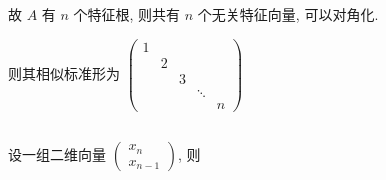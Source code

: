 		 故 \( A \) 有 \( n \) 个特征根, 则共有 \( n \) 个无关特征向量, 可以对角化.

		 则其相似标准形为 \( \begin{pmatrix}
			 1 &   &   &            \\
			   & 2 &   &            \\
			   &   & 3 &            \\
			   &   &   & \ddots     \\
			   &   &   &        & n
		 \end{pmatrix} \)


 \subsection{} %
	 \paragraph{} %
		 设一组二维向量 \( \begin{pmatrix}
			 x_{n} \\
			 x_{n-1}
		 \end{pmatrix} \), 则
